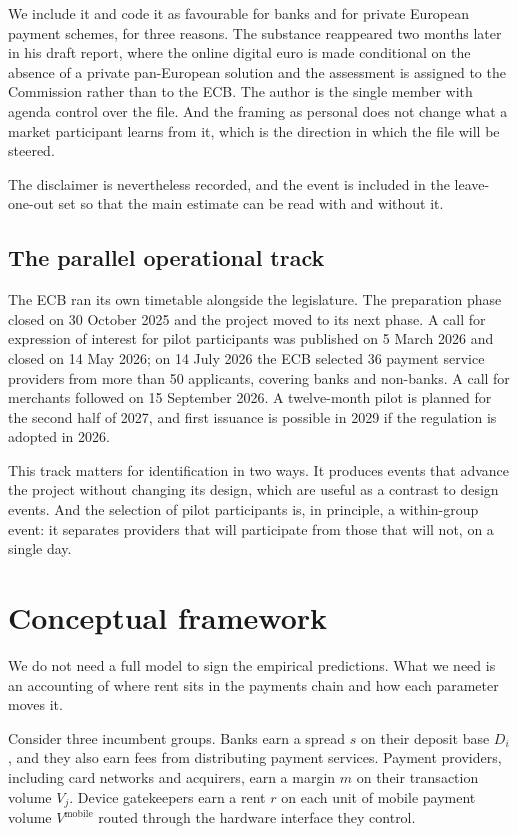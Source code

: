 \documentclass[11pt]{article}
\theoremstyle{plain}\newtheorem{proposition}{Proposition}
\begin{document}
We include it and code it as favourable for banks and for private European payment schemes, for three reasons. The substance reappeared two months later in his draft report, where the online digital euro is made conditional on the absence of a private pan-European solution and the assessment is assigned to the Commission rather than to the ECB. The author is the single member with agenda control over the file. And the framing as personal does not change what a market participant learns from it, which is the direction in which the file will be steered.

The disclaimer is nevertheless recorded, and the event is included in the leave-one-out set so that the main estimate can be read with and without it.

\subsection{The parallel operational track}

The ECB ran its own timetable alongside the legislature. The preparation phase closed on 30 October 2025 and the project moved to its next phase. A call for expression of interest for pilot participants was published on 5 March 2026 and closed on 14 May 2026; on 14 July 2026 the ECB selected 36 payment service providers from more than 50 applicants, covering banks and non-banks. A call for merchants followed on 15 September 2026. A twelve-month pilot is planned for the second half of 2027, and first issuance is possible in 2029 if the regulation is adopted in 2026.

This track matters for identification in two ways. It produces events that advance the project without changing its design, which are useful as a contrast to design events. And the selection of pilot participants is, in principle, a within-group event: it separates providers that will participate from those that will not, on a single day.

\section{Conceptual framework}\label{sec:framework}

We do not need a full model to sign the empirical predictions. What we need is an accounting of where rent sits in the payments chain and how each parameter moves it.

Consider three incumbent groups. Banks earn a spread $s$ on their deposit base $D_i$, and they also earn fees from distributing payment services. Payment providers, including card networks and acquirers, earn a margin $m$ on their transaction volume $V_j$. Device gatekeepers earn a rent $r$ on each unit of mobile payment volume $V^{\mathrm{mobile}}$ routed through the hardware interface they control.
\end{document}
